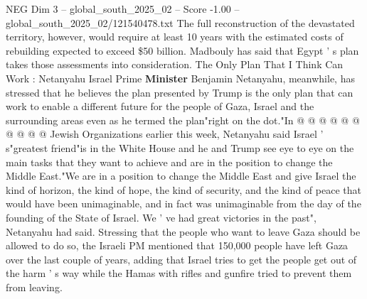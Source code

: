 \begin{textsample}{NEG Dim 3 – global\_south\_2025\_02 – Score -1.00 – global\_south\_2025\_02/121540478.txt}
The full reconstruction of the devastated territory, however, would require at least 10 years with the estimated costs of rebuilding expected to exceed \$50 billion.
Madbouly has said that Egypt ' s plan takes those assessments into consideration.
The Only Plan That I Think Can Work : Netanyahu Israel Prime \textbf{Minister} Benjamin Netanyahu, meanwhile, has stressed that he believes the plan presented by Trump is the only plan that can work to enable a different future for the people of Gaza, Israel and the surrounding areas even as he termed the plan"right on the dot."In @ @ @ @ @ @ @ @ @ @ Jewish Organizations earlier this week, Netanyahu said Israel ' s"greatest friend"is in the White House and he and Trump see eye to eye on the main tasks that they want to achieve and are in the position to change the Middle East."We are in a position to change the Middle East and give Israel the kind of horizon, the kind of hope, the kind of security, and the kind of peace that would have been unimaginable, and in fact was unimaginable from the day of the founding of the State of Israel.
We ' ve had great victories in the past", Netanyahu had said.
Stressing that the people who want to leave Gaza should be allowed to do so, the Israeli PM mentioned that 150,000 people have left Gaza over the last couple of years, adding that Israel tries to get the people get out of the harm ' s way while the Hamas with rifles and gunfire tried to prevent them from leaving.

\end{textsample}
